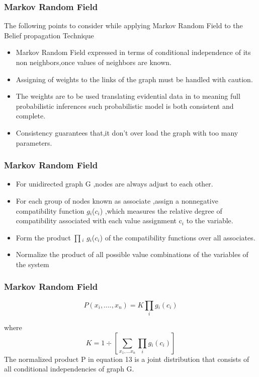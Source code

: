 \documentclass{beamer}
\begin{document}
\begin{frame}
\frametitle{\textbf{Markov Random Field}}
The following points to consider while applying Markov Random Field to the Belief propagation Technique
\begin{itemize}
\item Markov Random Field  expressed in terms of conditional independence of its non neighbors,once values of neighbors  are known.
\item Assigning of weights to the links of the graph must be handled with caution.
\item The weights are to be used translating evidential data in to meaning full probabilistic inferences such probabilistic model is both consistent and complete.
\item Consistency guarantees that,it don't over load the graph with too many parameters.
\end{itemize}
\end{frame}
\begin{frame}
\frametitle{\textbf{Markov  Random Field}}
\begin{itemize}
 \item For unidirected graph G ,nodes are always adjust to each other.
\item For each group of nodes known as associate ,assign a nonnegative compatibility function $g{_i}$($c{_i}$) ,which measures the relative degree of compatibility associated with each value assignment c${_i}$ to the variable.
\item Form the product $\prod{_i}$ $g{_i}$($c{_i}$) of the compatibility functions over all associates.

\item Normalize the product of all possible value combinations of the variables of the system
\end{itemize}
\end{frame}

\begin{frame}
\frametitle{\textbf{Markov  Random Field}}


\begin{equation}\label{}
    P( x{_i},....,x{_n}) =K\prod_{i}g{_i}(c{_i})
\end{equation}

where
 \begin{equation}\label{}
    K= 1\div[\sum_{x{_1},...x{_n}}\prod_{i}g{_i}(c{_i})]
 \end{equation}
 The normalized product P in equation 13 is a joint distribution that consists of all conditional independencies of graph G.
\end{frame}
\end{document}
